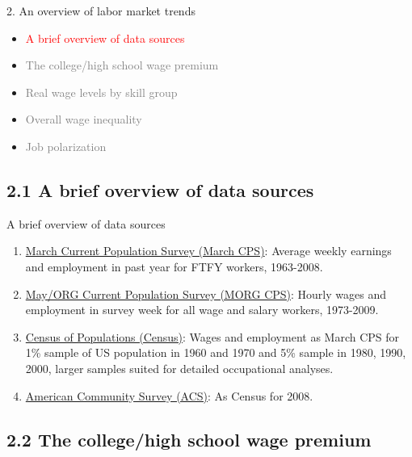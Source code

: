 \documentclass[notes=show]{beamer}
\begin{document}
\begin{frame}{2. An overview of labor market trends}
\begin{itemize}
\item[\textcolor{red}{2.1}] \textcolor{red}{A brief overview of data sources} \medskip
\item[\textcolor{gray}{2.2}] \textcolor{gray}{The college/high school wage premium} \medskip
\item[\textcolor{gray}{2.3}] \textcolor{gray}{Real wage levels by skill group} \medskip
\item[\textcolor{gray}{2.4}] \textcolor{gray}{Overall wage inequality} \medskip
\item [\textcolor{gray}{2.5}] \textcolor{gray}{Job polarization}
\end{itemize}
\end{frame}

\subsection{2.1 A brief overview of data sources}

\begin{frame}{A brief overview of data sources}
\begin{enumerate}
\item \underline{March Current Population Survey (March CPS)}: \linebreak
Average weekly earnings and employment in past year for FTFY workers, 1963-2008. \smallskip
\item \underline{May/ORG Current Population Survey (MORG CPS)}: \linebreak
Hourly wages and employment in survey week for all wage and salary workers, 1973-2009. \smallskip
\item \underline{Census of Populations (Census)}: \linebreak
Wages and employment as March CPS for 1\% sample of US population in 1960 and 1970 and 5\% sample in 1980, 1990, 2000, larger samples suited for detailed occupational analyses.\smallskip
\item \underline{American Community Survey (ACS)}: \linebreak
As Census for 2008.
\end{enumerate}
\end{frame}

\subsection{2.2 The college/high school wage premium}
\end{document}
